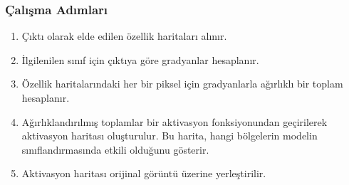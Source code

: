 \subsubsection{Çalışma Adımları}
\begin{enumerate}
    \item Çıktı olarak elde edilen özellik haritaları alınır.
    \item İlgilenilen sınıf için çıktıya göre gradyanlar hesaplanır.
    \item Özellik haritalarındaki her bir piksel için gradyanlarla ağırlıklı bir toplam hesaplanır. 
    \item Ağırlıklandırılmış toplamlar bir aktivasyon fonksiyonundan geçirilerek aktivasyon haritası oluşturulur. Bu harita, hangi bölgelerin modelin sınıflandırmasında etkili olduğunu gösterir.
    \item Aktivasyon haritası orijinal görüntü üzerine yerleştirilir.
\end{enumerate}

\newpage